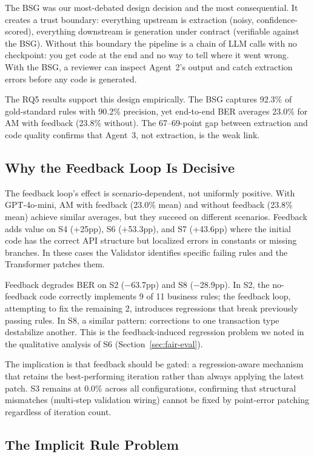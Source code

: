 \documentclass[conference]{IEEEtran}
\begin{document}
The BSG was our most-debated design decision and the most consequential. It creates a trust boundary: everything upstream is extraction (noisy, confidence-scored), everything downstream is generation under contract (verifiable against the BSG). Without this boundary the pipeline is a chain of LLM calls with no checkpoint: you get code at the end and no way to tell where it went wrong. With the BSG, a reviewer can inspect Agent~2's output and catch extraction errors before any code is generated.

The RQ5 results support this design empirically. The BSG captures 92.3\% of gold-standard rules with 90.2\% precision, yet end-to-end BER averages 23.0\% for AM with feedback (23.8\% without). The 67--69-point gap between extraction and code quality confirms that Agent~3, not extraction, is the weak link.

\subsection{Why the Feedback Loop Is Decisive}
\label{sec:feedback-decisive}

The feedback loop's effect is scenario-dependent, not uniformly positive. With GPT-4o-mini, AM with feedback (23.0\% mean) and without feedback (23.8\% mean) achieve similar averages, but they succeed on different scenarios. Feedback adds value on S4 (+25pp), S6 (+53.3pp), and S7 (+43.6pp) where the initial code has the correct API structure but localized errors in constants or missing branches. In these cases the Validator identifies specific failing rules and the Transformer patches them.

Feedback degrades BER on S2 ($-$63.7pp) and S8 ($-$28.9pp). In S2, the no-feedback code correctly implements 9 of 11 business rules; the feedback loop, attempting to fix the remaining 2, introduces regressions that break previously passing rules. In S8, a similar pattern: corrections to one transaction type destabilize another. This is the feedback-induced regression problem we noted in the qualitative analysis of S6 (Section~\ref{sec:fair-eval}).

The implication is that feedback should be gated: a regression-aware mechanism that retains the best-performing iteration rather than always applying the latest patch. S3 remains at 0.0\% across all configurations, confirming that structural mismatches (multi-step validation wiring) cannot be fixed by point-error patching regardless of iteration count.

\subsection{The Implicit Rule Problem}
\end{document}
